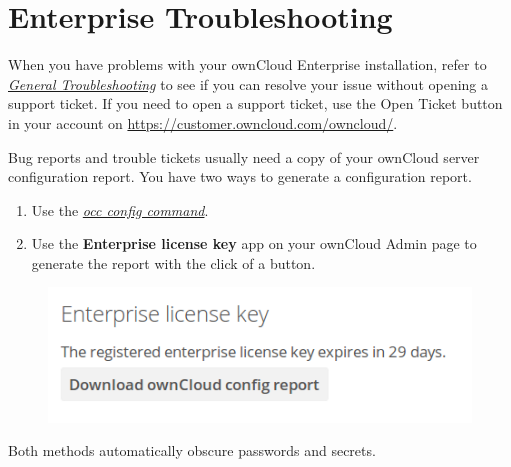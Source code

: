 \documentclass[letterpaper,10pt,english]{sphinxmanual}
\begin{document}
\section{Enterprise Troubleshooting}
\label{enterprise_troubleshooting:enterprise-troubleshooting}\label{enterprise_troubleshooting::doc}
When you have problems with your ownCloud Enterprise installation, refer to
{\hyperref[issues/general_troubleshooting::doc]{\emph{General Troubleshooting}}} to see if you can resolve your issue
without opening a support ticket. If you need to open a support ticket, use the
Open Ticket button in your account on
\href{https://customer.owncloud.com/owncloud/}{https://customer.owncloud.com/owncloud/}.

Bug reports and trouble tickets usually need a copy of your ownCloud server
configuration report. You have two ways to generate a configuration report.
\begin{enumerate}
\item {} 
Use the {\hyperref[configuration_server/occ_command:config-commands-label]{\emph{occ config command}}}.

\item {} 
Use the \textbf{Enterprise license key} app on your ownCloud Admin page to
generate the report with the click of a button.

\end{enumerate}
\begin{figure}[htbp]
\centering

\includegraphics{config-report-1.png}
\end{figure}

Both methods automatically obscure passwords and secrets.



\renewcommand{\indexname}{Index}
\printindex
\end{document}
